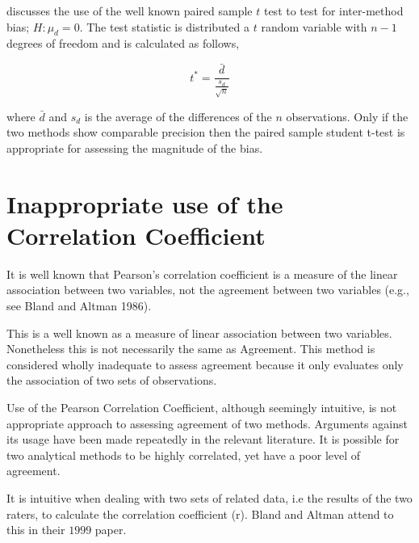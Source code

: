 \documentclass[12pt, a4paper]{report}
\theoremstyle{plain}
\theoremstyle{definition}
\theoremstyle{remark}
\begin{document}
\citet{Bartko} discusses the use of the well known paired sample
			$t$ test to test for inter-method bias; $H: \mu_{d}=0$. The test
			statistic is distributed a $t$ random variable with $n-1$ degrees
			of freedom and is calculated as follows,
			
			\begin{equation}
				t^{*} = \frac{\bar{d}}{ \frac{s_{d}}{\sqrt{n}}}
			\end{equation}
			
			where $\bar{d}$ and $s_{d}$ is the average of the differences of
			the $n$ observations. Only if the two methods show comparable
			precision then the paired sample student t-test is appropriate for
			assessing the magnitude of the bias.

			

			
	\section{Inappropriate use of the Correlation Coefficient}

It is well known that Pearson's correlation coefficient is a measure of the linear association between two variables, not the agreement between two variables (e.g., see Bland and Altman 1986).


This is a well known as a measure of linear association between two	variables. Nonetheless this is not necessarily the same as Agreement. This method is considered wholly inadequate to assess
		agreement because it only evaluates only the association of two sets of observations.
		
	 Use of the Pearson
	 Correlation Coefficient, although seemingly intuitive, is not
	 appropriate approach to assessing agreement of two methods.
	 Arguments against its usage have been made repeatedly in the
	 relevant literature. It is possible for two analytical methods to
	 be highly correlated, yet have a poor level of agreement.
	 	
	It is intuitive when dealing with two sets of related data, i.e
	the results of the two raters, to calculate the correlation
	coefficient (r). Bland and Altman attend to this in their $1999$
	paper.
	
\end{document}
